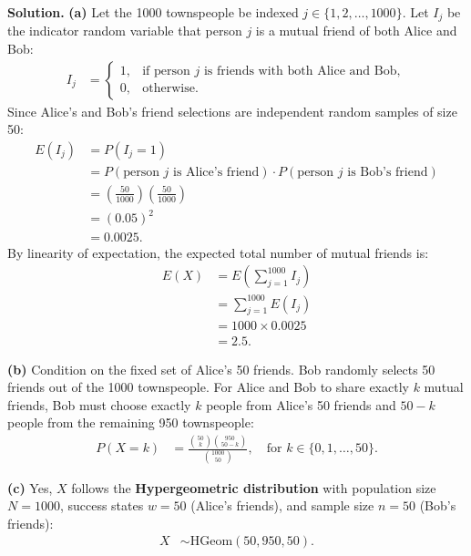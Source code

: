 \documentclass[11pt,a4paper]{article}
\begin{document}
\noindent \textbf{Solution.} \textbf{(a)} Let the 1000 townspeople be indexed $j \in \{1, 2, \dots, 1000\}$. Let $I_j$ be the indicator random variable that person $j$ is a mutual friend of both Alice and Bob:
\begin{align*}
I_j &= \begin{cases}
1, & \text{if person } j \text{ is friends with both Alice and Bob}, \\
0, & \text{otherwise}.
\end{cases}
\end{align*}
Since Alice's and Bob's friend selections are independent random samples of size 50:
\begin{align*}
E(I_j) &= P(I_j = 1) \\
&= P(\text{person } j \text{ is Alice's friend}) \cdot P(\text{person } j \text{ is Bob's friend}) \\
&= \left(\frac{50}{1000}\right) \left(\frac{50}{1000}\right) \\
&= (0.05)^2 \\
&= 0.0025.
\end{align*}
By linearity of expectation, the expected total number of mutual friends is:
\begin{align*}
E(X) &= E\left( \sum_{j=1}^{1000} I_j \right) \\
&= \sum_{j=1}^{1000} E(I_j) \\
&= 1000 \times 0.0025 \\
&= 2.5.
\end{align*}

\vspace{4pt}
\noindent \textbf{(b)} Condition on the fixed set of Alice's 50 friends. Bob randomly selects 50 friends out of the 1000 townspeople. For Alice and Bob to share exactly $k$ mutual friends, Bob must choose exactly $k$ people from Alice's 50 friends and $50 - k$ people from the remaining 950 townspeople:
\begin{align*}
P(X = k) &= \frac{\binom{50}{k} \binom{950}{50 - k}}{\binom{1000}{50}}, \quad \text{for } k \in \{0, 1, \dots, 50\}.
\end{align*}

\vspace{4pt}
\noindent \textbf{(c)} Yes, $X$ follows the \textbf{Hypergeometric distribution} with population size $N = 1000$, success states $w = 50$ (Alice's friends), and sample size $n = 50$ (Bob's friends):
\begin{align*}
X &\sim \text{HGeom}(50, 950, 50).
\end{align*}
\end{document}
